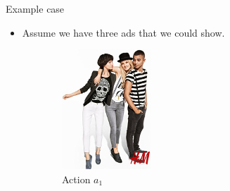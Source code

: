 \documentclass{beamer}
\begin{document}
\begin{frame}{Example case}
  \begin{itemize}
    \item{Assume we have three ads that we could show.}
  \end{itemize}
  \begin{figure}
    \centering
    \begin{subfigure}[b]{0.2\textwidth}
      \includegraphics[width=\textwidth]{ad1.png}
      \caption*{Action $a_1$}
    \end{subfigure}
    \begin{subfigure}[b]{0.2\textwidth}

\end{subfigure}
\end{figure}
\end{frame}
\end{document}
